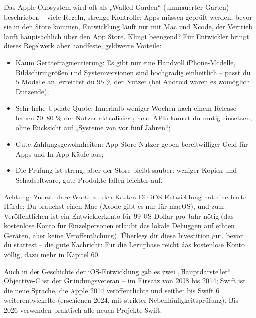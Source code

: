 
Das Apple-Ökosystem wird oft als „Walled Garden“ (ummauerter Garten) beschrieben – viele Regeln, strenge Kontrolle: Apps müssen geprüft werden, bevor sie in den Store kommen, Entwicklung läuft nur mit Mac und Xcode, der Vertrieb läuft hauptsächlich über den App Store. Klingt beengend? Für Entwickler bringt dieses Regelwerk aber handfeste, geldwerte Vorteile:

\begin{itemize}
  \item Kaum Gerätefragmentierung: Es gibt nur eine Handvoll iPhone-Modelle, Bildschirmgrößen und Systemversionen sind hochgradig einheitlich – passt du 5 Modelle an, erreichst du 95 \% der Nutzer (bei Android wären es womöglich Dutzende);
  \item Sehr hohe Update-Quote: Innerhalb weniger Wochen nach einem Release haben 70–80 \% der Nutzer aktualisiert; neue APIs kannst du mutig einsetzen, ohne Rücksicht auf „Systeme von vor fünf Jahren“;
  \item Gute Zahlungsgewohnheiten: App-Store-Nutzer geben bereitwilliger Geld für Apps und In-App-Käufe aus;
  \item Die Prüfung ist streng, aber der Store bleibt sauber: weniger Kopien und Schadsoftware, gute Produkte fallen leichter auf.
\end{itemize}

\begin{tcbwarn}{Achtung: Zuerst klare Worte zu den Kosten}
Die iOS-Entwicklung hat eine harte Hürde: Du brauchst einen Mac (Xcode gibt es nur für macOS), und zum Veröffentlichen ist ein Entwicklerkonto für 99 US-Dollar pro Jahr nötig (das kostenlose Konto für Einzelpersonen erlaubt das lokale Debuggen auf echten Geräten, aber keine Veröffentlichung). Überlege dir diese Investition gut, bevor du startest – die gute Nachricht: Für die Lernphase reicht das kostenlose Konto völlig, dazu mehr in Kapitel 60.

\end{tcbwarn}


Auch in der Geschichte der iOS-Entwicklung gab es zwei „Hauptdarsteller“. Objective-C ist der Gründungsveteran – im Einsatz von 2008 bis 2014; Swift ist die neue Sprache, die Apple 2014 veröffentlichte und seither bis Swift 6 weiterentwickelte (erschienen 2024, mit strikter Nebenläufigkeitsprüfung). Bis 2026 verwenden praktisch alle neuen Projekte Swift.

